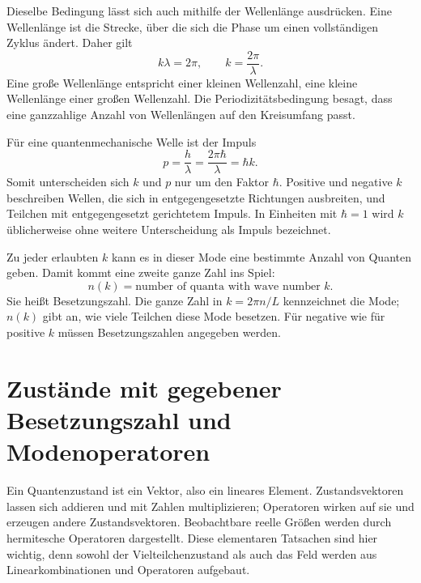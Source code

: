 Dieselbe Bedingung lässt sich auch mithilfe der Wellenlänge ausdrücken. Eine Wellenlänge ist die Strecke, über die sich die Phase um einen vollständigen Zyklus ändert. Daher gilt
\begin{equation}
k\lambda=2\pi,
\qquad
k=\frac{2\pi}{\lambda}.
\end{equation}
Eine große Wellenlänge entspricht einer kleinen Wellenzahl, eine kleine Wellenlänge einer großen Wellenzahl. Die Periodizitätsbedingung besagt, dass eine ganzzahlige Anzahl von Wellenlängen auf den Kreisumfang passt.

Für eine quantenmechanische Welle ist der Impuls
\begin{equation}
p=\frac{h}{\lambda}
=\frac{2\pi\hbar}{\lambda}
=\hbar k.
\end{equation}
Somit unterscheiden sich \(k\) und \(p\) nur um den Faktor \(\hbar\). Positive und negative \(k\) beschreiben Wellen, die sich in entgegengesetzte Richtungen ausbreiten, und Teilchen mit entgegengesetzt gerichtetem Impuls. In Einheiten mit \(\hbar=1\) wird \(k\) üblicherweise ohne weitere Unterscheidung als Impuls bezeichnet.

Zu jeder erlaubten \(k\) kann es in dieser Mode eine bestimmte Anzahl von Quanten geben. Damit kommt eine zweite ganze Zahl ins Spiel:
\begin{equation}
n(k)=\text{number of quanta with wave number }k.
\end{equation}
Sie heißt Besetzungszahl. Die ganze Zahl in \(k=2\pi n/L\) kennzeichnet die Mode; \(n(k)\) gibt an, wie viele Teilchen diese Mode besetzen. Für negative wie für positive \(k\) müssen Besetzungszahlen angegeben werden.

\begin{classroomqa}
\end{classroomqa}

\section{Zustände mit gegebener Besetzungszahl und Modenoperatoren}

Ein Quantenzustand ist ein Vektor, also ein lineares Element. Zustandsvektoren lassen sich addieren und mit Zahlen multiplizieren; Operatoren wirken auf sie und erzeugen andere Zustandsvektoren. Beobachtbare reelle Größen werden durch hermitesche Operatoren dargestellt. Diese elementaren Tatsachen sind hier wichtig, denn sowohl der Vielteilchenzustand als auch das Feld werden aus Linearkombinationen und Operatoren aufgebaut.

